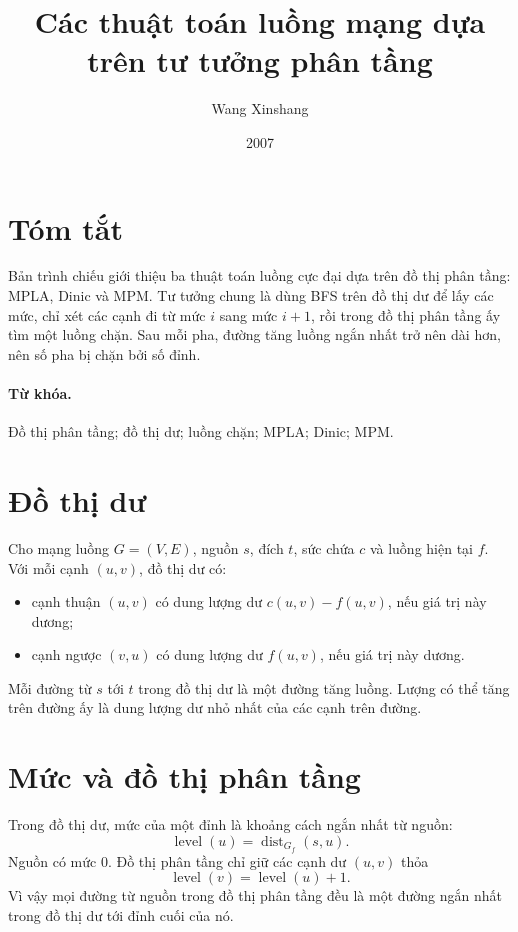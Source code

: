 \documentclass[11pt]{article}
\title{Các thuật toán luồng mạng dựa trên tư tưởng phân tầng}
\author{Wang Xinshang}
\date{2007}
\newcommand{\level}{\operatorname{level}}
\begin{document}
\maketitle


\section*{Tóm tắt}

Bản trình chiếu giới thiệu ba thuật toán luồng cực đại dựa trên đồ thị phân
tầng: MPLA, Dinic và MPM. Tư tưởng chung là dùng BFS trên đồ thị dư để lấy
các mức, chỉ xét các cạnh đi từ mức \(i\) sang mức \(i+1\), rồi trong đồ thị
phân tầng ấy tìm một luồng chặn. Sau mỗi pha, đường tăng luồng ngắn nhất trở
nên dài hơn, nên số pha bị chặn bởi số đỉnh.

\paragraph{Từ khóa.}
Đồ thị phân tầng; đồ thị dư; luồng chặn; MPLA; Dinic; MPM.

\section{Đồ thị dư}

Cho mạng luồng \(G=(V,E)\), nguồn \(s\), đích \(t\), sức chứa \(c\) và luồng
hiện tại \(f\). Với mỗi cạnh \((u,v)\), đồ thị dư có:
\begin{itemize}
  \item cạnh thuận \((u,v)\) có dung lượng dư \(c(u,v)-f(u,v)\), nếu giá trị
  này dương;
  \item cạnh ngược \((v,u)\) có dung lượng dư \(f(u,v)\), nếu giá trị này
  dương.
\end{itemize}
Mỗi đường từ \(s\) tới \(t\) trong đồ thị dư là một đường tăng luồng. Lượng
có thể tăng trên đường ấy là dung lượng dư nhỏ nhất của các cạnh trên đường.

\section{Mức và đồ thị phân tầng}

Trong đồ thị dư, mức của một đỉnh là khoảng cách ngắn nhất từ nguồn:
\[
  \level(u)=\operatorname{dist}_{G_f}(s,u).
\]
Nguồn có mức \(0\). Đồ thị phân tầng chỉ giữ các cạnh dư \((u,v)\) thỏa
\[
  \level(v)=\level(u)+1.
\]
Vì vậy mọi đường từ nguồn trong đồ thị phân tầng đều là một đường ngắn nhất
trong đồ thị dư tới đỉnh cuối của nó.
\end{document}
